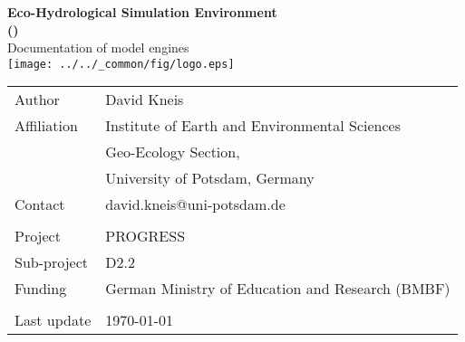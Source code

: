 \documentclass[a4paper,twocolumn,10pt,fleqn]{book}
\begin{document}

\pagestyle{empty}
\onecolumn

\begin{center}
  \vspace*{5cm}
  \LARGE
  \textbf{Eco-Hydrological Simulation Environment \\ ()} \\
  \vspace*{1.2cm}
  Documentation of model engines \\
  \vspace*{2.0cm}
  \texttt{[image: ../../\_common/fig/logo.eps]}
\end{center}

\cleardoublepage

\vspace*{14cm}
\begin{tabular}{ll}
Author      & David Kneis \\
Affiliation & Institute of Earth and Environmental Sciences \\
            & Geo-Ecology Section, \\
            & University of Potsdam, Germany \\
Contact     & david.kneis@uni-potsdam.de \\
            & \\
Project     & PROGRESS \\
Sub-project & D2.2 \\
Funding     & German Ministry of Education and Research (BMBF) \\
            & \\
Last update & \today{} \\
\end{tabular}

\cleardoublepage


\pagestyle{fancy}                       %
\fancyfoot{}                            %
\renewcommand{\chaptermark}[1]{         %
  \markboth{\chaptername\ \thechapter\ \hspace{0.5cm} #1}{}}
\renewcommand{\sectionmark}[1]{         %
  \markright{\thesection\ \hspace{0.5cm} #1}}
\fancyhead[LE,RO]{\bfseries\thepage}    %
\fancyhead[RE]{\bfseries\leftmark}      %
\fancyhead[LO]{\bfseries\rightmark}     %
\renewcommand{\headrulewidth}{0.3pt}    %
\end{document}
